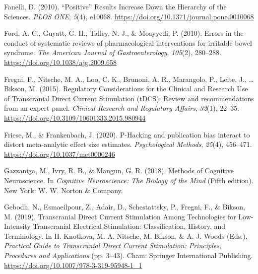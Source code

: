 \documentclass[
  man,floatsintext]{apa6}
\newlength{\cslhangindent}
\newlength{\cslentryspacingunit} %
\newenvironment{CSLReferences}[2] %
 {%
  \setlength{\parindent}{0pt}
  \ifodd #1
  \let\oldpar\par
  \def\par{\hangindent=\cslhangindent\oldpar}
  \fi
  \setlength{\parskip}{#2\cslentryspacingunit}
 }%
 {}
\begin{document}
\begin{CSLReferences}{1}{0}
\leavevmode{}%
Fanelli, D. (2010). {``{Positive}''} {Results Increase Down} the {Hierarchy} of the {Sciences}. \emph{PLOS ONE}, \emph{5}(4), e10068. \url{https://doi.org/10.1371/journal.pone.0010068}

\leavevmode{}%
Ford, A. C., Guyatt, G. H., Talley, N. J., \& Moayyedi, P. (2010). Errors in the conduct of systematic reviews of pharmacological interventions for irritable bowel syndrome. \emph{The American Journal of Gastroenterology}, \emph{105}(2), 280--288. \url{https://doi.org/10.1038/ajg.2009.658}

\leavevmode{}%
Fregni, F., Nitsche, M. A., Loo, C. K., Brunoni, A. R., Marangolo, P., Leite, J., \ldots{} Bikson, M. (2015). Regulatory {Considerations} for the {Clinical} and {Research Use} of {Transcranial Direct Current Stimulation} ({tDCS}): Review and recommendations from an expert panel. \emph{Clinical Research and Regulatory Affairs}, \emph{32}(1), 22--35. \url{https://doi.org/10.3109/10601333.2015.980944}

\leavevmode{}%
Friese, M., \& Frankenbach, J. (2020). P-{Hacking} and publication bias interact to distort meta-analytic effect size estimates. \emph{Psychological Methods}, \emph{25}(4), 456--471. \url{https://doi.org/10.1037/met0000246}

\leavevmode{}%
Gazzaniga, M., Ivry, R. B., \& Mangun, G. R. (2018). Methods of {Cognitive Neuroscience}. In \emph{Cognitive {Neuroscience}: {The Biology} of the {Mind}} (Fifth edition). {New York}: {W. W. Norton \& Company}.

\leavevmode{}%
Gebodh, N., Esmaeilpour, Z., Adair, D., Schestattsky, P., Fregni, F., \& Bikson, M. (2019). Transcranial {Direct Current Stimulation Among Technologies} for {Low-Intensity Transcranial Electrical Stimulation}: {Classification}, {History}, and {Terminology}. In H. Knotkova, M. A. Nitsche, M. Bikson, \& A. J. Woods (Eds.), \emph{Practical {Guide} to {Transcranial Direct Current Stimulation}: {Principles}, {Procedures} and {Applications}} (pp. 3--43). {Cham}: {Springer International Publishing}. \url{https://doi.org/10.1007/978-3-319-95948-1_1}


\end{CSLReferences}
\end{document}
